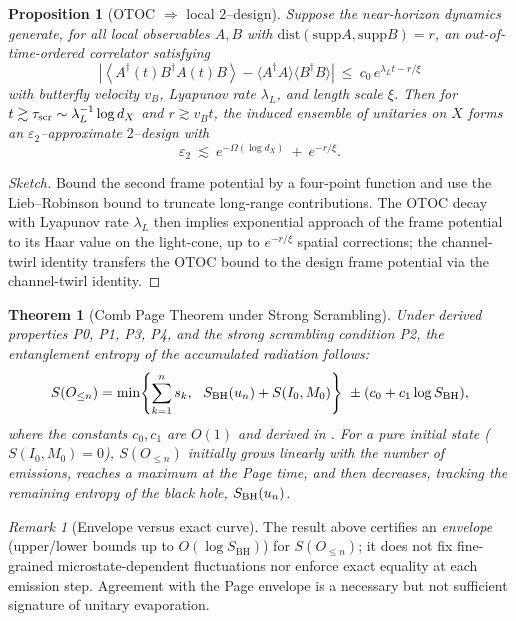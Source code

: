 \documentclass[a4paper,11pt]{article}
\newcommand{\SBH}{\ensuremath{S_{\mathrm{BH}}}}
\theoremstyle{plain}
\newtheorem{theorem}{Theorem}
\newtheorem{proposition}{Proposition}
\theoremstyle{definition}
\theoremstyle{remark}
\newtheorem{remark}{Remark}
\begin{document}
\begin{proposition}[OTOC $\Rightarrow$ local $2$--design]\label{prop:otoc-design}
Suppose the near-horizon dynamics generate, for all local observables $A,B$ with $\mathrm{dist}(\mathrm{supp}A,\mathrm{supp}B)=r$, an out-of-time-ordered correlator satisfying
\begin{equation}
\left|\left\langle A^\dagger(t) B^\dagger A(t) B \right\rangle - \langle A^\dagger A\rangle \langle B^\dagger B\rangle\right| \ \le\ c_0\, e^{\lambda_L t - r/\xi}
\end{equation}
with butterfly velocity $v_B$, Lyapunov rate $\lambda_L$, and length scale $\xi$. Then for $t\gtrsim \tau_{\rm scr}\sim \lambda_L^{-1}\log d_X$ and $r\gtrsim v_B t$, the induced ensemble of unitaries on $X$ forms an $\varepsilon_2$--approximate $2$--design with
\begin{equation}
\varepsilon_2 \ \lesssim\ e^{-\Omega(\log d_X)}\ +\ e^{-r/\xi}.
\end{equation}
\end{proposition}
\begin{proof}[Sketch]
Bound the second frame potential by a four-point function and use the Lieb--Robinson bound to truncate long-range contributions. The OTOC decay with Lyapunov rate $\lambda_L$ then implies exponential approach of the frame potential to its Haar value on the light-cone, up to $e^{-r/\xi}$ spatial corrections; the channel-twirl identity transfers the OTOC bound to the design frame potential via the channel-twirl identity.
\end{proof}

\begin{theorem}[Comb Page Theorem under Strong Scrambling]
\label{thm:comb-page}
Under derived properties P0, P1, P3, P4, and the strong scrambling condition P2, the entanglement entropy of the accumulated radiation follows:
\begin{equation}
\label{eq:comb-page}
S(O_{\le n}) = \min\!\left\{\sum_{k=1}^n s_k,\ \ S_{\rm BH}(u_n) + S(I_0, M_0)\right\} \ \pm (c_0 + c_1\log S_{\rm BH}),
\end{equation}
%
where the constants $c_0, c_1$ are $O(1)$ and derived in . For a pure initial state ($S(I_0, M_0)=0$), $S(O_{\le n})$ initially grows linearly with the number of emissions, reaches a maximum at the Page time, and then decreases, tracking the remaining entropy of the black hole, $S_{\rm BH}(u_n)$.
\end{theorem}
\begin{remark}[Envelope versus exact curve]
The result above certifies an \emph{envelope} (upper/lower bounds up to $O(\log \SBH)$) for $S(O_{\le n})$; it does not fix fine-grained microstate-dependent fluctuations nor enforce exact equality at each emission step. Agreement with the Page envelope is a necessary but not sufficient signature of unitary evaporation.
\end{remark}
\end{document}
